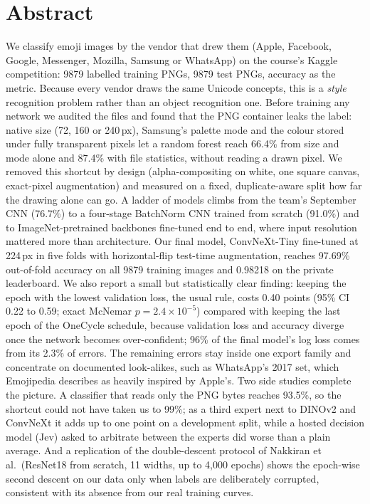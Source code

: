 \documentclass[11pt,a4paper]{article}
\newcommand{\pct}[1]{#1\%}
\begin{document}
\section*{Abstract}
We classify emoji images by the vendor that drew them (Apple, Facebook, Google, Messenger, Mozilla, Samsung or WhatsApp) on the course's Kaggle competition: \num{9879} labelled training PNGs, \num{9879} test PNGs, accuracy as the metric. Because every vendor draws the same Unicode concepts, this is a \emph{style} recognition problem rather than an object recognition one. Before training any network we audited the files and found that the PNG container leaks the label: native size (72, 160 or 240\,px), Samsung's palette mode and the colour stored under fully transparent pixels let a random forest reach \pct{66.4} from size and mode alone and \pct{87.4} with file statistics, without reading a drawn pixel. We removed this shortcut by design (alpha-compositing on white, one square canvas, exact-pixel augmentation) and measured on a fixed, duplicate-aware split how far the drawing alone can go. A ladder of models climbs from the team's September CNN (\pct{76.7}) to a four-stage BatchNorm CNN trained from scratch (\pct{91.0}) and to ImageNet-pretrained backbones fine-tuned end to end, where input resolution mattered more than architecture. Our final model, ConvNeXt-Tiny fine-tuned at 224\,px in five folds with horizontal-flip test-time augmentation, reaches \pct{97.69} out-of-fold accuracy on all \num{9879} training images and 0.98218 on the private leaderboard. We also report a small but statistically clear finding: keeping the epoch with the lowest validation loss, the usual rule, costs 0.40 points (95\% CI 0.22 to 0.59; exact McNemar $p = 2.4\times10^{-5}$) compared with keeping the last epoch of the OneCycle schedule, because validation loss and accuracy diverge once the network becomes over-confident; \pct{96} of the final model's log loss comes from its \pct{2.3} of errors. The remaining errors stay inside one export family and concentrate on documented look-alikes, such as WhatsApp's 2017 set, which Emojipedia describes as heavily inspired by Apple's. Two side studies complete the picture. A classifier that reads only the PNG bytes reaches \pct{93.5}, so the shortcut could not have taken us to 99\%; as a third expert next to DINOv2 and ConvNeXt it adds up to one point on a development split, while a hosted decision model (Jev) asked to arbitrate between the experts did worse than a plain average. And a replication of the double-descent protocol of Nakkiran et al.\ (ResNet18 from scratch, 11 widths, up to 4{,}000 epochs) shows the epoch-wise second descent on our data only when labels are deliberately corrupted, consistent with its absence from our real training curves.
\end{document}
